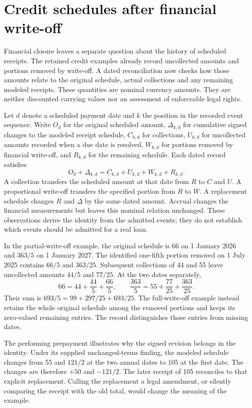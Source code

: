 \section{Credit schedules after financial write-off}
\label{sim:credit-claim-continuity}

Financial closure leaves a separate question about the history of scheduled
receipts. The retained credit examples already record uncollected amounts and
portions removed by write-off. A dated reconciliation now checks how those
amounts relate to the original schedule, actual collections and any remaining
modeled receipts. These quantities are nominal currency amounts. They are
neither discounted carrying values nor an assessment of enforceable legal
rights.

Let $d$ denote a scheduled payment date and $k$ the position in the recorded
event sequence. Write $O_d$ for the original scheduled amount, $\Delta_{k,d}$
for cumulative signed changes to the modeled receipt schedule, $C_{k,d}$ for
collections, $U_{k,d}$ for uncollected amounts recorded when a due date is
resolved, $W_{k,d}$ for portions removed by financial write-off, and $R_{k,d}$
for the remaining schedule. Each dated record satisfies
\[
 O_d+\Delta_{k,d}=C_{k,d}+U_{k,d}+W_{k,d}+R_{k,d}.
\]
A collection transfers the scheduled amount at that date from $R$ to $C$ and
$U$. A proportional write-off transfers the specified portion from $R$ to
$W$. A replacement schedule changes $R$ and $\Delta$ by the same dated amount.
Accrual changes the financial measurements but leaves this nominal relation
unchanged. These observations derive the identity from the admitted events;
they do not establish which events should be admitted for a real loan.

In the partial-write-off example, the original schedule is 66 on 1 January
2026 and $363/5$ on 1 January 2027. The identified one-fifth portion removed
on 1 July 2025 contains $66/5$ and $363/25$. Subsequent collections of 44 and
55 leave uncollected amounts $44/5$ and $77/25$. At the two dates separately,
\[
 66=44+\frac{44}{5}+\frac{66}{5},\qquad
 \frac{363}{5}=55+\frac{77}{25}+\frac{363}{25}.
\]
Their sum is $693/5=99+297/25+693/25$. The full-write-off example instead
retains the whole original schedule among the removed portions and keeps its
zero-valued remaining entries. The record distinguishes those entries from
missing dates.

The performing prepayment illustrates why the signed revision belongs in the
identity. Under its supplied unchanged-terms finding, the modeled schedule
changes from 55 and $121/2$ at the two annual dates to 105 at the first date.
The changes are therefore $+50$ and $-121/2$. The later receipt of 105 reconciles
to that explicit replacement. Calling the replacement a legal amendment, or
silently comparing the receipt with the old total, would change the meaning
of the example.

